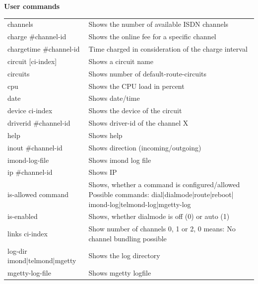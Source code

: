   \begin{table}
    \textbf{User commands}

    \vspace{1ex}
    \begin{tabular}{lp{9cm}}
      channels                  & Shows the number of available ISDN
                                  channels\\
      charge \#channel-id       & Shows the online fee for a specific
                                  channel\\
      chargetime \#channel-id   & Time charged in consideration of the
                                  charge interval\\
      circuit [ci-index]        & Shows a circuit name\\
      circuits                  & Shows number of default-route-circuits\\
      cpu                       & Shows the CPU load in percent\\
      date                      & Shows date/time\\
      device ci-index           & Shows the device of the circuit\\
      driverid \#channel-id     & Shows driver-id of the channel X\\
      help                      & Shows help\\
      inout \#channel-id        & Shows direction (incoming/outgoing)\\
      imond-log-file            & Shows imond log file\\
      ip \#channel-id           & Shows IP\\
      is-allowed command        & Shows, whether a command is
                                  configured/allowed\newline
                                  Possible commands:
                                    dial|dialmode|route|reboot|
                                    imond-log|telmond-log|mgetty-log \\
      is-enabled                & Shows, whether dialmode is off (0) or auto
                                  (1)\\
      links ci-index            & Show number of channels 0, 1 or
                                  2, 0 means: No channel bundling possible\\
      log-dir imond|telmond|mgetty& Shows the log directory\\
      mgetty-log-file           & Shows mgetty logfile\\

\end{tabular}
\end{table}

